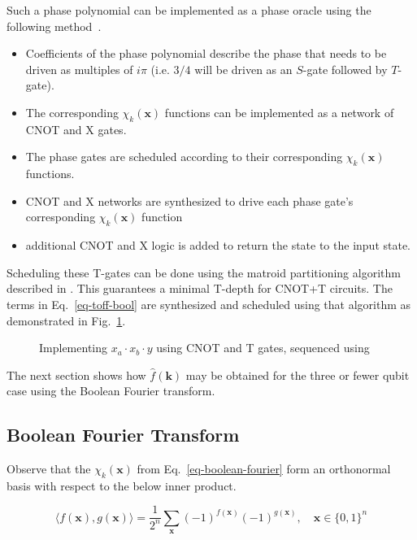 Such a phase polynomial can be implemented as a phase oracle using the following
method~\cite{amy-meet-in-middle}.

\begin{itemize}
\item Coefficients of the phase polynomial describe the phase that needs to be driven
  as multiples of $i\pi$ (i.e. $3/4$ will be driven as an $S$-gate followed by $T$-gate).
\item The corresponding $\chi_k(\mathbf{x})$ functions can be implemented as a network
  of CNOT and X gates.
\item The phase gates are scheduled according to their corresponding $\chi_k(\mathbf{x})$
  functions.
\item CNOT and X networks are synthesized to drive each phase gate's corresponding
  $\chi_k(\mathbf{x})$ function
\item additional CNOT and X logic is added to return the state to the input state.
\end{itemize}

Scheduling these T-gates can be done using the matroid partitioning algorithm described in
\cite{bib-amy-matroid}. This guarantees a minimal T-depth for CNOT+T circuits.
The terms in Eq.~\ref{eq-toff-bool} are synthesized and scheduled using that algorithm as
demonstrated in Fig.~\ref{fig-toff-mark-matroid}.

\begin{figure}[t]
  \centering
  \scalebox{0.7} {
    
  }
  \caption{Implementing $x_a \cdot x_b \cdot y$ using CNOT and T gates, sequenced using~\cite{bib-amy-matroid}}
  \label{fig-toff-mark-matroid}
  \vspace{-0.5cm}
\end{figure}

The next section shows how $\hat{f}(\mathbf{k})$ may be obtained for the three or fewer qubit case using the
Boolean Fourier transform.

\subsection{Boolean Fourier Transform}
\label{Pre:Four}
Observe that the $\chi_k(\mathbf{x})$ from Eq.~\ref{eq-boolean-fourier} form an orthonormal basis with respect
to the below inner product.

\begin{equation}
  \label{eq-inner-prod}
  \langle f(\mathbf{x}) , g(\mathbf{x}) \rangle = \frac{1}{2^n} \sum_{\mathbf{x}} (-1)^{f(\mathbf{x})} (-1)^{g(\mathbf{x})}, \quad \mathbf{x} \in \{0,1\}^n
\end{equation}

